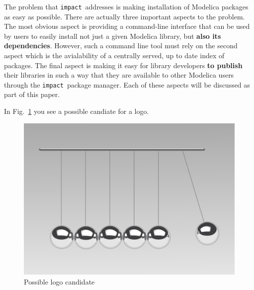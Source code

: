 \documentclass[11pt,a4paper,twocolumn]{article}
\newcommand{\impact}{\texttt{impact}} %
\begin{document}
The problem that \impact\ addresses is making installation of Modelica packages as 
easy as possible.  There are actually three important aspects to the problem.  The 
most obvious aspect is providing a command-line interface that can be used by 
users to easily install not just a given Modelica library, but \textbf{also its 
dependencies}.  However, such a command line tool must rely on the second aspect 
which is the avialability of a centrally served, up to date index of packages.  
The final aspect is making it easy for library developers \textbf{to publish} 
their libraries in such a way that they are available to other Modelica users 
through the \impact\ package manager.  Each of these aspects will be discussed as 
part of this paper.





In Fig.~\ref{fig:newtons_cradle} you see a possible candiate for a logo.


\begin{figure}[!ht]
  \centering
  \includegraphics[width=\columnwidth]{newtons_cradle}
  \caption{Possible logo candidate \cite{Andersson2007}}
  \label{fig:newtons_cradle}
\end{figure}
\end{document}
